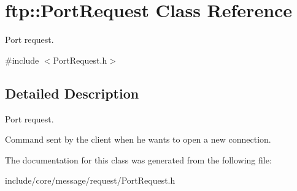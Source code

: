 \hypertarget{classftp_1_1_port_request}{\section{ftp\-:\-:Port\-Request Class Reference}
\label{classftp_1_1_port_request}
}


Port request.  




{\ttfamily \#include $<$Port\-Request.\-h$>$}



\subsection{Detailed Description}
Port request. 

Command sent by the client when he wants to open a new connection. 

The documentation for this class was generated from the following file\-:\begin{DoxyCompactItemize}
\item 
include/core/message/request/Port\-Request.\-h\end{DoxyCompactItemize}
